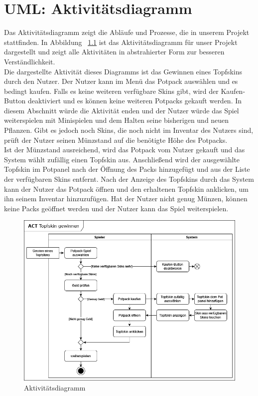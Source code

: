 \chapter{UML: Aktivitätsdiagramm}\label{ch:uml_act}
Das Aktivitätsdiagramm zeigt die Abläufe und Prozesse, die in unserem Projekt stattfinden.
In Abbildung ~\ref{fig:act} ist das Aktivitätsdiagramm für unser Projekt dargestellt und zeigt alle Aktivitäten in 
abstrahierter Form zur besseren Verständlichkeit. \\
\newline
Die dargestellte Aktivität dieses Diagramms ist das Gewinnen eines Topfskins durch den Nutzer.
Der Nutzer kann im Menü das Potpack auswählen und es bedingt kaufen.
Falls es keine weiteren verfügbare Skins gibt, wird der Kaufen-Button deaktiviert und es können keine weiteren
Potpacks gekauft werden.
In diesem Abschnitt würde die Aktivität enden und der Nutzer würde das Spiel weiterspielen mit Minispielen und dem 
Halten seine bisherigen und neuen Pflanzen.
Gibt es jedoch noch Skins, die noch nicht im Inventar des Nutzers sind, prüft der Nutzer seinen Münzstand auf die 
benötigte Höhe des Potpacks.\\
Ist der Münzstand ausreichend, wird das Potpack vom Nutzer gekauft und das System wählt zufällig einen Topfskin aus.
Anschließend wird der ausgewählte Topfskin im Potpanel nach der Öffnung des Packs hinzugefügt und aus der Liste der
verfügbaren Skins entfernt. 
Nach der Anzeige des Topfskins durch das System kann der Nutzer das Potpack öffnen und den erhaltenen Topfskin anklicken, 
um ihn seinem Inventar hinzuzufügen.
Hat der Nutzer nicht genug Münzen, können keine Packs geöffnet werden und der Nutzer kann das Spiel weiterspielen.\\

\begin{figure}[h]
    \centering
    \includegraphics[width=0.8\linewidth]{../bilder/act_potpack}
    \vspace{0.05cm}
    \caption{Aktivitätsdiagramm}
    \label{fig:act}
\end{figure}